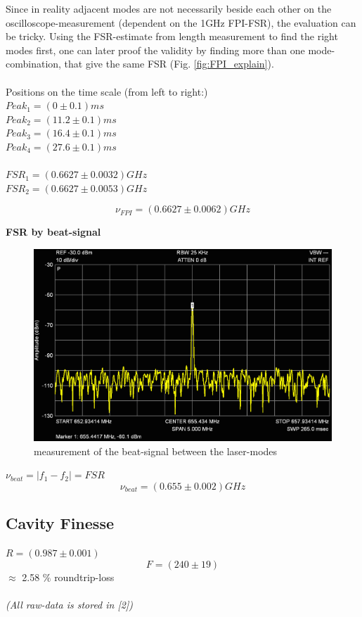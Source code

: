 \documentclass[12pt,a4paper]{article}
\begin{document}
\begin{multicols}{2}
\noindent Since in reality adjacent modes are not necessarily beside each other on the oscilloscope-measurement (dependent on the 1GHz FPI-FSR), the evaluation can be tricky. Using the FSR-estimate from length measurement to find the right modes first, one can later proof the validity by finding more than one mode-combination, that give the same FSR (Fig. \ref{fig:FPI_explain}).\\
\\
Positions on the time scale (from left to right:)\\
$Peak_1=(0 \pm 0.1)ms$\\
$Peak_2=(11.2 \pm 0.1)ms$\\
$Peak_3=(16.4 \pm 0.1)ms$\\
$Peak_4=(27.6 \pm 0.1)ms$\\
\\
$FSR_1 = (0.6627 \pm 0.0032)GHz$\\
$FSR_2 = (0.6627 \pm 0.0053)GHz$

$$\nu_{FPI} = (0.6627 \pm 0.0062)GHz$$

\noindent \textbf{FSR by beat-signal}\\

\begin{figure}[H]
 \centering
 \includegraphics[scale=0.18]{./figures/655mhz_peak1.png}
 \caption{measurement of the beat-signal between the laser-modes}
 \label{fig:beatsignal}
\end{figure}

$\nu_{beat}=|f_1 - f_2|= FSR$
$$\nu_{beat}=(0.655 \pm 0.002)GHz$$


\subsection{Cavity Finesse}
$R = (0.987 \pm 0.001)$
$$F = (240 \pm 19)$$ 
$\approx$ 2.58 $\%$ roundtrip-loss\\
\\
\textit{(All raw-data is stored in [2])}


\end{multicols}
\end{document}
